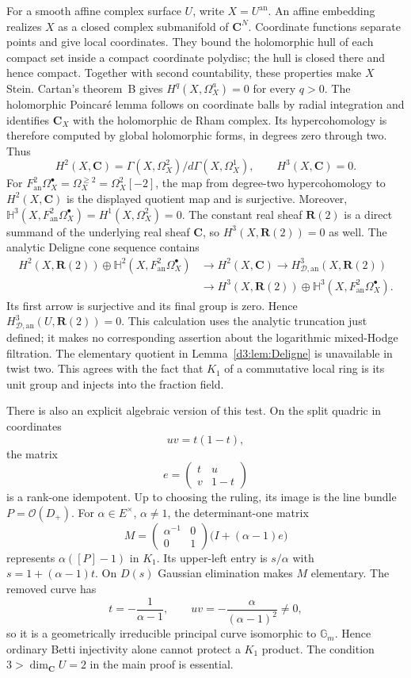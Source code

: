 \documentclass[11pt,a4paper]{amsart}
\numberwithin{equation}{section}
\theoremstyle{definition}
\theoremstyle{remark}
\newcommand{\R}{\mathbf R}
\newcommand{\C}{\mathbf C}
\newcommand{\OO}{\mathcal O}
\newcommand{\HD}{H_{\mathcal D,\mathrm{an}}}
\begin{document}
For a smooth affine complex surface $U$, write $X=U^{\mathrm{an}}$.
An affine embedding realizes $X$ as a closed complex submanifold
of $\C^N$. Coordinate functions separate points and give local
coordinates. They bound the holomorphic hull of each compact set
inside a compact coordinate polydisc; the hull is closed there
and hence compact. Together with second countability, these
properties make $X$ Stein.
Cartan's theorem~B
\cite[\S5, proof of Theorem~B, pp.~19-14--19-15]{CartanStein1952}
gives $H^q(X,\Omega_X^a)=0$ for every $q>0$.
The holomorphic Poincar\'e lemma follows on coordinate balls by
radial integration and identifies $\C_X$ with the holomorphic
de Rham complex. Its hypercohomology is therefore computed by
global holomorphic forms, in degrees zero through two. Thus
\[
 H^2(X,\C)=\Gamma(X,\Omega_X^2)/d\Gamma(X,\Omega_X^1),
 \qquad H^3(X,\C)=0.
\]
For
$F^2_{\mathrm{an}}\Omega_X^\bullet=\Omega_X^{\ge2}
=\Omega_X^2[-2]$, the map from degree-two hypercohomology to
$H^2(X,\C)$ is the displayed quotient map and is surjective.
Moreover,
$\mathbb H^3(X,F^2_{\mathrm{an}}\Omega_X^\bullet)
=H^1(X,\Omega_X^2)=0$.
The constant real sheaf $\R(2)$ is a direct summand of the
underlying real sheaf $\C$, so $H^3(X,\R(2))=0$ as well.
The analytic Deligne cone sequence contains
\[
\begin{split}
 H^2(X,\R(2))\oplus
 \mathbb H^2(X,F^2_{\mathrm{an}}\Omega_X^\bullet)
 &\longrightarrow H^2(X,\C)\longrightarrow\HD^3(X,\R(2))\\
 &\longrightarrow H^3(X,\R(2))\oplus
 \mathbb H^3(X,F^2_{\mathrm{an}}\Omega_X^\bullet).
\end{split}
\]
Its first arrow is surjective and its final group is zero.
Hence $\HD^3(U,\R(2))=0$.
This calculation uses the analytic truncation just defined;
it makes no corresponding assertion about the logarithmic
mixed-Hodge filtration.
The elementary quotient in Lemma~\ref{d3:lem:Deligne} is
unavailable in twist two. This agrees with the fact that $K_1$
of a commutative local ring is its unit group and injects into
the fraction field.

There is also an explicit algebraic version of this test. On the split quadric in coordinates
\[
uv=t(1-t),
\]
the matrix
\[
e=\begin{pmatrix}t&u\\v&1-t\end{pmatrix}
\]
is a rank-one idempotent. Up to choosing the ruling, its image is the line bundle $P=\OO(D_+)$. For $\alpha\in E^\times$, $\alpha\neq1$, the determinant-one matrix
\[
M=\begin{pmatrix}\alpha^{-1}&0\\0&1\end{pmatrix}
\bigl(I+(\alpha-1)e\bigr)
\]
represents $\alpha([P]-1)$ in $K_1$. Its upper-left entry is $s/\alpha$ with $s=1+(\alpha-1)t$. On $D(s)$ Gaussian elimination makes $M$ elementary. The removed curve has
\[
t=-\frac1{\alpha-1},\qquad uv=-\frac{\alpha}{(\alpha-1)^2}\neq0,
\]
so it is a geometrically irreducible principal curve isomorphic to $\mathbb G_m$. Hence ordinary Betti injectivity alone cannot protect a $K_1$ product. The condition $3>\dim_{\C}U=2$ in the main proof is essential.
\end{document}
